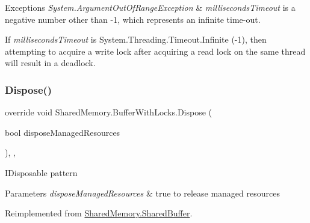 \begin{DoxyExceptions}{Exceptions}
{\em System.\+Argument\+Out\+Of\+Range\+Exception} & {\itshape milliseconds\+Timeout}  is a negative number other than -\/1, which represents an infinite time-\/out.\\
\hline
\end{DoxyExceptions}


If {\itshape milliseconds\+Timeout}  is System.\+Threading.\+Timeout.\+Infinite (-\/1), then attempting to acquire a write lock after acquiring a read lock on the same thread will result in a deadlock.\mbox{\label{class_shared_memory_1_1_buffer_with_locks_a3b01026691fcd0c1b2088ebabb0780d4}} 
\subsubsection{\texorpdfstring{Dispose()}{Dispose()}}
{\footnotesize\ttfamily override void Shared\+Memory.\+Buffer\+With\+Locks.\+Dispose (\begin{DoxyParamCaption}\item[{bool}]{dispose\+Managed\+Resources }\end{DoxyParamCaption})\hspace{0.3cm}{\ttfamily [inline]}, {\ttfamily [protected]}, {\ttfamily [virtual]}}



I\+Disposable pattern 


\begin{DoxyParams}{Parameters}
{\em dispose\+Managed\+Resources} & true to release managed resources\\
\hline
\end{DoxyParams}


Reimplemented from \hyperlink{class_shared_memory_1_1_shared_buffer_aa3db897346aa2c22a9d0d6b05ff7c058}{Shared\+Memory.\+Shared\+Buffer}.

\mbox{\label{class_shared_memory_1_1_buffer_with_locks_adf97b7891d30d2cc24ea39e232a0b238}} 
